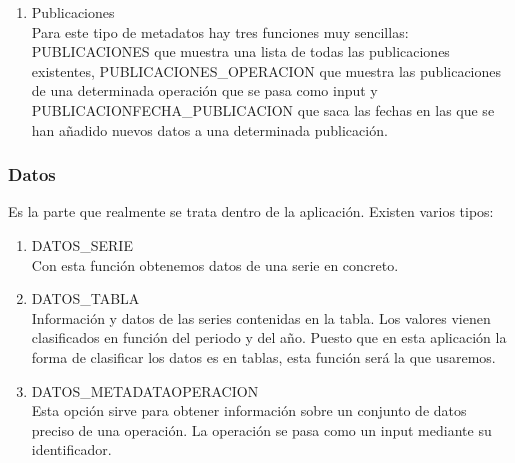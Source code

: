 \begin{enumerate}
    \item Publicaciones\\
    Para este tipo de metadatos hay tres funciones muy sencillas: PUBLICACIONES que muestra una lista de todas las publicaciones existentes, PUBLICACIONES\_OPERACION que muestra las publicaciones de una determinada operación que se pasa como input y PUBLICACIONFECHA\_PUBLICACION que saca las fechas en las que se han añadido nuevos datos a una determinada publicación.\\
\end{enumerate}
\subsubsection{Datos}
Es la parte que realmente se trata dentro de la aplicación. Existen varios tipos:\\
\begin{enumerate}
    \item DATOS\_SERIE\\
    Con esta función obtenemos datos de una serie en concreto.\\
    \item DATOS\_TABLA\\
     Información y datos de las series contenidas en la tabla. Los valores vienen clasificados en función del periodo y del año. Puesto que en esta aplicación la forma de clasificar los datos es en tablas, esta función será la que usaremos.\\ 
     \item DATOS\_METADATAOPERACION\\
      Esta opción sirve para obtener información sobre un conjunto de datos preciso de una operación. La operación se pasa como un input mediante su identificador.\\
\end{enumerate}
